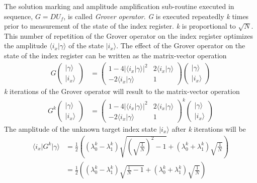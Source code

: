 The solution marking and amplitude amplification sub-routine executed in sequence, $G=DU_f$, is called \textit{Grover operator}. \textit{G} is executed repeatedly \textit{k} times prior to measurement of the state of the index register. \textit{k} is proportional to $\sqrt{N}$. This number of repetition of the Grover operator on the index register optimizes the amplitude $\langle i_{x} \vert \gamma \rangle$ of the state $\vert i_{x} \rangle$. The effect of the Grover operator on the state of the index register can be written as the matrix-vector operation \cite{C5Williams2011}
\begin{align}
G
\begin{pmatrix}
\vert \gamma \rangle\\
\vert i_{x} \rangle
\end{pmatrix}
&=
\begin{pmatrix}
1-4\left\vert\langle i_{x} \vert \gamma \rangle\right\vert^{2} & 2\langle i_{x} \vert \gamma \rangle\\
-2\langle i_{x} \vert \gamma \rangle & 1
\end{pmatrix}
\begin{pmatrix}
\vert \gamma \rangle\\
\vert i_{x} \rangle
\end{pmatrix}
\end{align}
\textit{k} iterations of the Grover operator will result to the matrix-vector operation
\begin{align}
G^{k}
\begin{pmatrix}
\vert \gamma \rangle\\
\vert i_{x} \rangle
\end{pmatrix}
&=
\begin{pmatrix}
1-4\left\vert\langle i_{x} \vert \gamma \rangle\right\vert^{2} & 2\langle i_{x} \vert \gamma \rangle\\
-2\langle i_{x} \vert \gamma \rangle & 1
\end{pmatrix}^{k}
\begin{pmatrix}
\vert \gamma \rangle\\
\vert i_{x} \rangle
\end{pmatrix}
\end{align}
The amplitude of the unknown target index state $\vert i_{x} \rangle$ after \textit{k} iterations will be 
\begin{align}
\langle i_{x} \vert G^{k} \vert \gamma \rangle &=
\frac{1}{2} 
\left(
\left(\lambda_0^k - \lambda_1^k \right)\sqrt{\left(\sqrt{\frac{1}{N}}\right)^2 - 1} + \left(\lambda_0^k + \lambda_1^k\right) \sqrt{\frac{1}{N}}
\right)\\
&=
\frac{1}{2} 
\left(
\left(\lambda_0^k - \lambda_1^k \right)\sqrt{\frac{1}{N} - 1} + \left(\lambda_0^k + \lambda_1^k\right) \sqrt{\frac{1}{N}}
\right)
\end{align}
